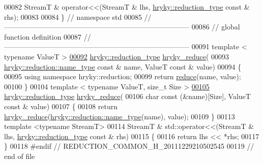 \begin{DoxyCode}
00082     StreamT & operator<<(StreamT & lhs, \hyperlink{classhryky_1_1_intrusive_ptr}{hryky::reduction_type} \textcolor{keyword}{const} & rhs);
00083 
00084 \} \textcolor{comment}{// namespace std}
00085 \textcolor{comment}{//
      ------------------------------------------------------------------------------}
00086 \textcolor{comment}{// global function definition}
00087 \textcolor{comment}{//
      ------------------------------------------------------------------------------}
00091 \textcolor{comment}{}\textcolor{keyword}{template} < \textcolor{keyword}{typename} ValueT >
\hypertarget{reduction__common_8h_source_l00092}{}\hyperlink{reduction__common_8h_afc72326c9900838c5db40438318794dd}{00092} \hyperlink{classhryky_1_1_intrusive_ptr}{hryky::reduction_type} \hyperlink{reduction__common_8h_afc72326c9900838c5db40438318794dd}{hryky_reduce}(
00093     \hyperlink{classhryky_1_1reduction_1_1_string}{hryky::reduction::name_type} \textcolor{keyword}{const} & name, ValueT \textcolor{keyword}{const} & value)
00094 \{
00095     \textcolor{keyword}{using namespace }hryky::reduction;
00099     \textcolor{keywordflow}{return} \hyperlink{namespacehryky_1_1reduction_a064022926c530d18aeb1b2abdf71800b}{reduce}(name, value);
00100 \}
00104 \textcolor{keyword}{template} < \textcolor{keyword}{typename} ValueT, \textcolor{keywordtype}{size\_t} Size >
\hypertarget{reduction__common_8h_source_l00105}{}\hyperlink{reduction__common_8h_af168ce538960763466d4357838249fa7}{00105} \hyperlink{classhryky_1_1_intrusive_ptr}{hryky::reduction_type} \hyperlink{reduction__common_8h_afc72326c9900838c5db40438318794dd}{hryky_reduce}(
00106     \textcolor{keywordtype}{char} \textcolor{keyword}{const} (&name)[Size], ValueT \textcolor{keyword}{const} & value)
00107 \{
00108     \textcolor{keywordflow}{return} \hyperlink{reduction__common_8h_afc72326c9900838c5db40438318794dd}{hryky_reduce}(\hyperlink{classhryky_1_1reduction_1_1_string}{hryky::reduction::name_type}(name), value);
00109 \}
00113 \textcolor{keyword}{template} <\textcolor{keyword}{typename} StreamT>
00114 StreamT & std::operator<<(StreamT & lhs, \hyperlink{classhryky_1_1_intrusive_ptr}{hryky::reduction_type} \textcolor{keyword}{const} & rhs)
00115 \{
00116     \textcolor{keywordflow}{return} lhs << *rhs;
00117 \}
00118 \textcolor{preprocessor}{#endif // REDUCTION\_COMMON\_H\_20111229210502545}
00119 \textcolor{preprocessor}{}\textcolor{comment}{// end of file}
\end{DoxyCode}
